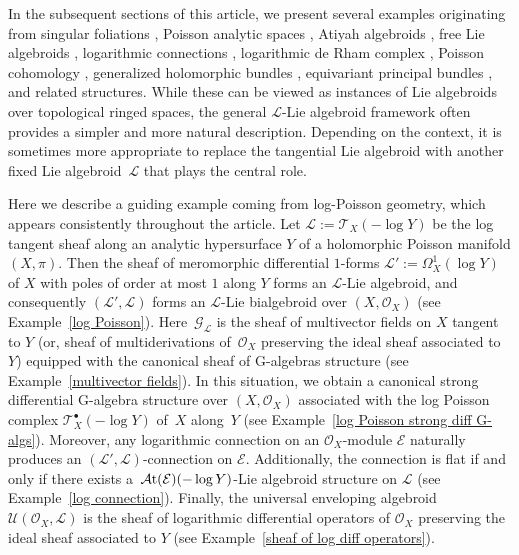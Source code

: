 \documentclass[pdftex]{sigma}
\numberwithin{equation}{section}
\theoremstyle{definition}
\begin{document}
In the subsequent sections of this article, we present several examples originating from singular foliations \cite{RF, LGLRLR, CL, BP}, Poisson analytic spaces \cite{BP}, Atiyah algebroids \cite{UB, MK}, free Lie algebroids \cite{MK}, logarithmic connections \cite{IB, DKP}, logarithmic de Rham complex \cite{CMD, AS}, Poisson cohomology \cite{JH, BP}, generalized holomorphic bundles \cite{MG-GC, NH}, equivariant principal bundles \cite{IBMP, IB, BK-MP}, and related structures. While these can be viewed as instances of Lie algebroids over topological ringed spaces, the general $\mathcal{L}$-Lie algebroid framework often provides a simpler and more natural description. Depending on the context, it is sometimes more appropriate to replace the tangential Lie algebroid with another fixed Lie algebroid~$\mathcal{L}$ that plays the central role.

Here we describe a guiding example coming from log-Poisson geometry, which appears consistently throughout the article.
Let $\mathcal{L}:=\mathcal{T}_X(-\log Y)$ be the log tangent sheaf along an analytic hypersurface $Y$ of a holomorphic Poisson manifold $(X,\pi)$. Then the sheaf of meromorphic differential $1$-forms $\mathcal{L}':=\Omega_X^1(\log Y)$ of $X$ with poles of order at most $1$ along $Y$ forms an $\mathcal{L}$-Lie algebroid, and consequently $(\mathcal{L}',\mathcal{L})$ forms an $\mathcal{L}$-Lie bialgebroid over $(X,\mathcal{O}_X)$ (see Example~\ref{log Poisson}).
Here~$\mathcal{G}_{\mathcal{L}}$ is the sheaf of multivector fields on $X$ tangent to $Y$ (or, sheaf of multiderivations of~$\mathcal{O}_X$ preserving the ideal sheaf associated to $Y$) equipped with the canonical sheaf of G-algebras structure (see Example~\ref{multivector fields}). In this situation, we obtain a canonical strong differential G-algebra structure over $(X,\mathcal{O}_X)$ associated with the log Poisson complex $\mathcal{T}^{\bullet}_X(-\log Y)$ of~$X$ along~$Y$ (see Example~\ref{log Poisson strong diff G-algs}).
Moreover, any logarithmic connection on an $\mathcal{O}_X$-module $\mathcal{E}$ naturally produces an $(\mathcal{L}',\mathcal{L})$-connection on $\mathcal{E}$. Additionally, the connection is flat if and only if there exists a~$\mathcal{A}{\rm t}(\mathcal{E})(-\log Y)$-Lie algebroid structure on $\mathcal{L}$ (see Example~\ref{log connection}). Finally, the universal enveloping algebroid $\mathcal{U}(\mathcal{O}_X,\mathcal{L})$ is the sheaf of logarithmic differential operators of $\mathcal{O}_X$ preserving the ideal sheaf associated to $Y$ (see Example~\ref{sheaf of log diff operators}).
\end{document}

